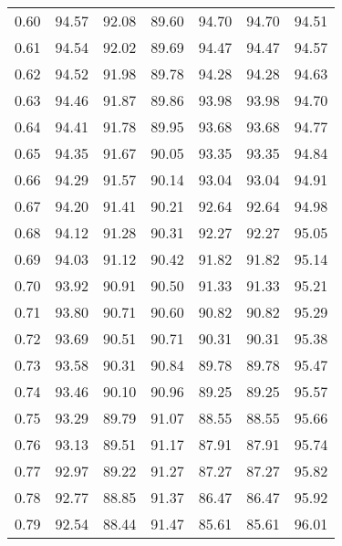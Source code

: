 \begin{tabular}{|c|c|c|c|c|c|c|}
      0.60 &     94.57 &     92.08 &      89.60 &   94.70 &      94.70 &         94.51 \\
      0.61 &     94.54 &     92.02 &      89.69 &   94.47 &      94.47 &         94.57 \\
      0.62 &     94.52 &     91.98 &      89.78 &   94.28 &      94.28 &         94.63 \\
      0.63 &     94.46 &     91.87 &      89.86 &   93.98 &      93.98 &         94.70 \\
      0.64 &     94.41 &     91.78 &      89.95 &   93.68 &      93.68 &         94.77 \\
      0.65 &     94.35 &     91.67 &      90.05 &   93.35 &      93.35 &         94.84 \\
      0.66 &     94.29 &     91.57 &      90.14 &   93.04 &      93.04 &         94.91 \\
      0.67 &     94.20 &     91.41 &      90.21 &   92.64 &      92.64 &         94.98 \\
      0.68 &     94.12 &     91.28 &      90.31 &   92.27 &      92.27 &         95.05 \\
      0.69 &     94.03 &     91.12 &      90.42 &   91.82 &      91.82 &         95.14 \\
      0.70 &     93.92 &     90.91 &      90.50 &   91.33 &      91.33 &         95.21 \\
      0.71 &     93.80 &     90.71 &      90.60 &   90.82 &      90.82 &         95.29 \\
      0.72 &     93.69 &     90.51 &      90.71 &   90.31 &      90.31 &         95.38 \\
      0.73 &     93.58 &     90.31 &      90.84 &   89.78 &      89.78 &         95.47 \\
      0.74 &     93.46 &     90.10 &      90.96 &   89.25 &      89.25 &         95.57 \\
      0.75 &     93.29 &     89.79 &      91.07 &   88.55 &      88.55 &         95.66 \\
      0.76 &     93.13 &     89.51 &      91.17 &   87.91 &      87.91 &         95.74 \\
      0.77 &     92.97 &     89.22 &      91.27 &   87.27 &      87.27 &         95.82 \\
      0.78 &     92.77 &     88.85 &      91.37 &   86.47 &      86.47 &         95.92 \\
      0.79 &     92.54 &     88.44 &      91.47 &   85.61 &      85.61 &         96.01 \\

\end{tabular}
